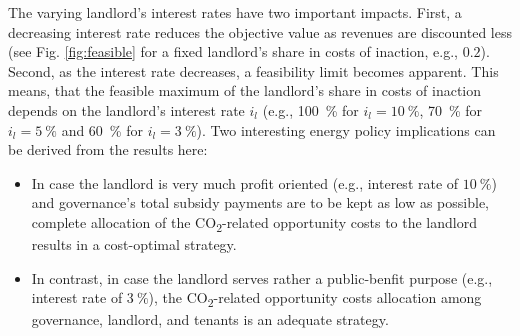 The varying landlord's interest rates have two important impacts. First, a decreasing interest rate reduces the objective value as revenues are discounted less (see Fig. \ref{fig:feasible} for a fixed landlord's share in costs of inaction, e.g., $0.2$). Second, as the interest rate decreases, a feasibility limit becomes apparent. This means, that the feasible maximum of the landlord's share in costs of inaction depends on the landlord's interest rate $i_l$ (e.g., \SI{100}{\%} for $i_l=\SI{10}{\%}$, \SI{70}{\%} for $i_l=\SI{5}{\%}$ and \SI{60}{\%} for $i_l=\SI{3}{\%}$). Two interesting energy policy implications can be derived from the results here:
\begin{itemize}
	\item In case the landlord is very much profit oriented (e.g., interest rate of $\SI{10}{\%}$) and governance's total subsidy payments are to be kept as low as possible, complete allocation of the CO\textsubscript{2}-related opportunity costs to the landlord results in a cost-optimal strategy.
	\item In contrast, in case the landlord serves rather a public-benfit purpose (e.g., interest rate of $\SI{3}{\%}$), the CO\textsubscript{2}-related opportunity costs allocation among governance, landlord, and tenants is an adequate strategy.
\end{itemize}


